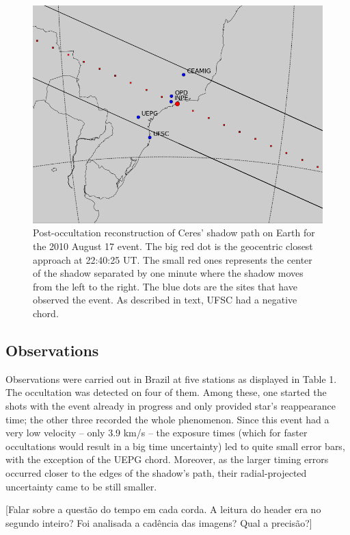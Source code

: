 \documentclass[useAMS,usenatbib]{mn2e}
\begin{document}
\begin{figure}
\includegraphics[scale=0.42]{figures/Ceres_2010.png} 
\caption{Post-occultation reconstruction of Ceres' shadow path on Earth for the 2010 August 17 event. The big red dot is the geocentric closest approach at 22:40:25 UT. The small red ones represents the center of the shadow separated by one minute where the shadow moves from the left to the right. The blue dots are the sites that have observed the event. As described in text, UFSC had a negative chord.
\label{Fig: Ceres-2010-map}}
\end{figure}



\subsection{Observations}

Observations were carried out in Brazil at five stations as displayed in Table 1. The occultation was detected on four of them. Among these, one started the shots with the event already in progress and only provided star's reappearance time; the other three recorded the whole phenomenon.  Since this event had a very low velocity -- only 3.9 km/s -- the exposure times (which for faster occultations would result in a big time uncertainty) led to quite small error bars, with the exception of the UEPG chord. Moreover, as the larger timing errors occurred closer to the edges of the shadow's path, their radial-projected uncertainty came to be still smaller.

[Falar sobre a quest\~ao do tempo em cada corda. A leitura do header era no segundo inteiro? Foi analisada a cad\^encia das imagens? Qual a precis\~ao?]
\end{document}
